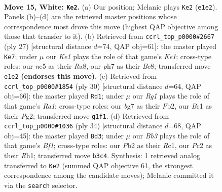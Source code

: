 \documentclass[11pt]{article}
\begin{document}
\clearpage

\begin{figure}[p]\centering
\begin{subfigure}{0.46\textwidth}\centering
\resizebox{\linewidth}{!}{%
\newchessgame
\chessboard[
  setfen={2kr2r1/ppp1ppbp/1n4p1/4n3/7P/NB3P2/PPP2P2/R1B1K1R1 w - - 0 15},
  showmover=false,
  pgfstyle=straightmove, color=movearrow, markmove={e1-e2}
]}
\caption{}
\end{subfigure}\hfill
\begin{subfigure}{0.46\textwidth}\centering
\resizebox{\linewidth}{!}{%
\newchessgame
\chessboard[
  setfen={r1b1k2r/1pp2p2/3p1p1p/p1b5/2P5/PP4P1/4PPBP/RN3RK1 b kq - 0 14},
  showmover=false,
  pgfstyle=straightmove, color=movearrow, markmove={e8-e7}
]}
\caption{}
\end{subfigure}
\\[4pt]
\begin{subfigure}{0.46\textwidth}\centering
\resizebox{\linewidth}{!}{%
\newchessgame
\chessboard[
  setfen={rn1r2k1/5ppp/bp3n2/2p5/4pP2/1BN1B3/PPP3PP/R3K2R w KQ - 2 16},
  showmover=false,
  pgfstyle=straightmove, color=movearrow, markmove={a1-d1}
]}
\caption{}
\end{subfigure}\hfill
\begin{subfigure}{0.46\textwidth}\centering
\resizebox{\linewidth}{!}{%
\newchessgame
\chessboard[
  setfen={1r3rk1/1p4bp/p2ppnp1/4n3/4P3/1P2BP2/P2K1NPP/2R2B1R w - - 0 18},
  showmover=false,
  pgfstyle=straightmove, color=movearrow, markmove={f1-d3}
]}
\caption{}
\end{subfigure}
\caption{\textbf{Move 15, White: \texttt{Ke2}.} (a) Our position; Melanie plays \texttt{Ke2} (\texttt{e1e2}). Panels (b)--(d) are the retrieved master positions whose correspondence most drove this move (highest QAP objective among those that transfer to it). (b) Retrieved from \texttt{ccrl\_top\_p0000\#2667} (ply 27) [structural distance $d$=74, QAP obj=61]: the master played \texttt{Ke7}; under $\mu$ our \emph{Ke1} plays the role of that game's \emph{Ke1}; cross-type roles: our \emph{n}e5 as their \emph{R}a8, our \emph{p}h7 as their \emph{B}c8; transferred move \texttt{e1e2} \textbf{(endorses this move)}. (c) Retrieved from \texttt{ccrl\_top\_p0000\#1854} (ply 30) [structural distance $d$=64, QAP obj=66]: the master played \texttt{Rd1}; under $\mu$ our \emph{Rg1} plays the role of that game's \emph{Ra1}; cross-type roles: our \emph{b}g7 as their \emph{P}b2, our \emph{B}c1 as their \emph{P}g2; transferred move \texttt{g1f1}. (d) Retrieved from \texttt{ccrl\_top\_p0000\#1036} (ply 34) [structural distance $d$=68, QAP obj=45]: the master played \texttt{Bd3}; under $\mu$ our \emph{Bb3} plays the role of that game's \emph{Bf1}; cross-type roles: our \emph{P}b2 as their \emph{R}c1, our \emph{P}c2 as their \emph{R}h1; transferred move \texttt{b3c4}. Synthesis: 1 retrieved analog transferred to \texttt{Ke2} (summed QAP objective 61, the strongest correspondence among the candidate moves); Melanie committed it via the \texttt{search} selector.}
\label{fig:thought-m28}
\end{figure}
\end{document}
